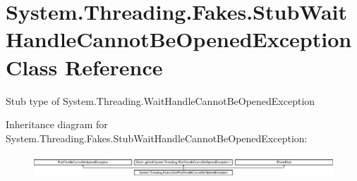 \hypertarget{class_system_1_1_threading_1_1_fakes_1_1_stub_wait_handle_cannot_be_opened_exception}{\section{System.\-Threading.\-Fakes.\-Stub\-Wait\-Handle\-Cannot\-Be\-Opened\-Exception Class Reference}
\label{class_system_1_1_threading_1_1_fakes_1_1_stub_wait_handle_cannot_be_opened_exception}
}


Stub type of System.\-Threading.\-Wait\-Handle\-Cannot\-Be\-Opened\-Exception 


Inheritance diagram for System.\-Threading.\-Fakes.\-Stub\-Wait\-Handle\-Cannot\-Be\-Opened\-Exception\-:\begin{figure}[H]
\begin{center}
\leavevmode
\includegraphics[height=0.860215cm]{class_system_1_1_threading_1_1_fakes_1_1_stub_wait_handle_cannot_be_opened_exception}
\end{center}
\end{figure}
